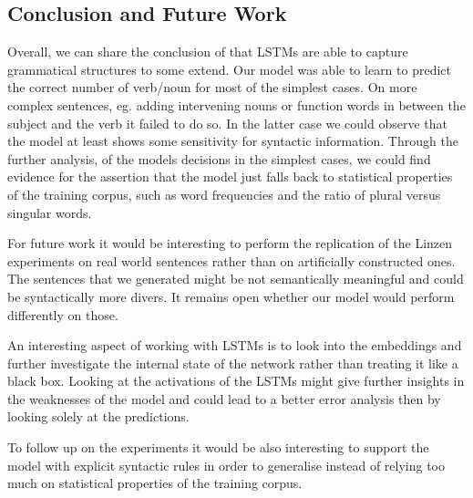 \documentclass[twoside]{article}
\begin{document}
\begin{multicols}{2}
\section{Conclusion and Future Work}
\label{conclusion}


Overall, we can share the conclusion of \cite{Linzen2016} that LSTMs are able to capture grammatical structures to some extend. Our model was able to learn to predict the correct number of verb/noun for most of the simplest cases. On more complex sentences, eg. adding intervening nouns or function words in between the subject and the verb it failed to do so. In the latter case we could observe that the model at least shows some sensitivity for syntactic information. Through the further analysis, of the models decisions in the simplest cases, we could find evidence for the assertion that the model just falls back to statistical properties of the training corpus, such as word frequencies and the ratio of plural versus singular words.


For future work it would be interesting to perform the replication of the Linzen experiments on real world sentences rather than on artificially constructed ones. The sentences that we generated might be not semantically meaningful and could be syntactically more divers. It remains open whether our model would perform differently on those.

An interesting aspect of working with LSTMs is to look into the embeddings and further investigate the internal state of the network rather than treating it like a black box. Looking at the activations of the LSTMs might give further insights in the weaknesses of the model and could lead to a better error analysis then by looking solely at the predictions. 

To follow up on the experiments it would be also interesting to support the model with explicit syntactic rules in order to generalise instead of relying too much on statistical properties of the training corpus.


%




\end{multicols}

\newpage


\end{document}
